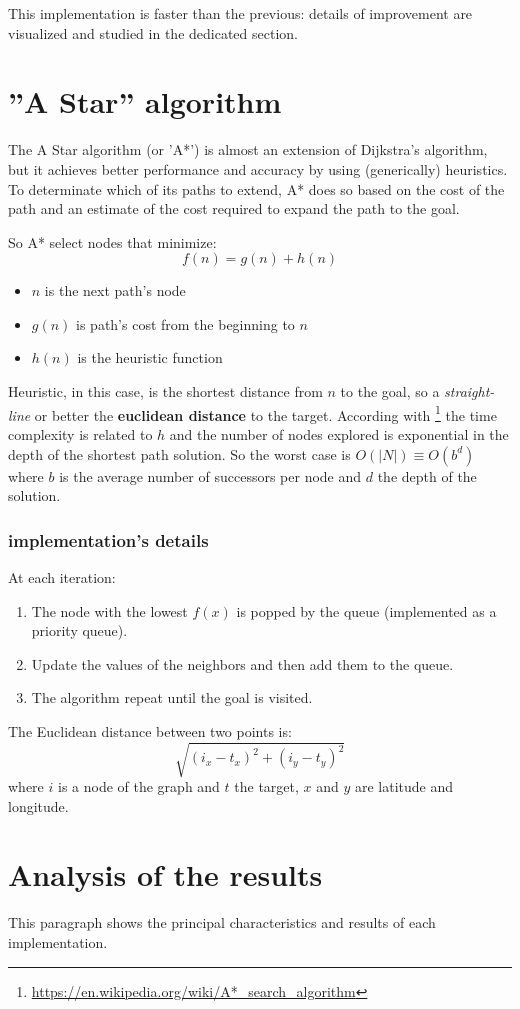 \documentclass[a4paper,12pt]{report}
\begin{document}
This implementation is faster than the previous: details of improvement are visualized and studied in the dedicated section.

\section{''A Star'' algorithm}
The A Star algorithm (or 'A*') is almost an extension of Dijkstra's algorithm, but it achieves better performance and accuracy by using (generically) heuristics. To determinate which of its paths to extend, A* does so based on the cost of the path and an estimate of the cost required to expand the path to the goal.

So A* select nodes that minimize:
$$ f(n) = g(n) + h(n)$$
\begin{itemize}
	\item $n$ is the next path's node
	\item $g(n)$ is path's cost from the beginning to $n$
	\item $h(n)$ is the heuristic function
\end{itemize}
Heuristic, in this case, is the shortest distance from $n$ to the goal, so a \textit{straight-line} or better the \textbf{euclidean distance} to the target.
According with \footnote{\url{https://en.wikipedia.org/wiki/A*_search_algorithm}} the time complexity is related to $h$ and the number of nodes explored is exponential in the depth of the shortest path solution.
So the worst case is $O(|N|) \equiv O(b^d)$ where $b$ is the average number of successors per node and $d$ the depth of the solution.
\subsubsection*{implementation's details}
At each iteration:
\begin{enumerate}
	\item The node with the lowest $f(x)$ is popped by the queue (implemented as a priority queue).
	\item Update the values of the neighbors and then add them to the queue.
	\item The algorithm repeat until the goal is visited.
\end{enumerate}
The Euclidean distance between two points is: $$\sqrt{(i_x - t_x)^2 + (i_y - t_y)^2}$$
where $i$ is a node of the graph and $t$ the target, $x$ and $y$ are latitude and longitude.


\section{Analysis of the results}
This paragraph shows the principal characteristics and results of each implementation.
\end{document}
